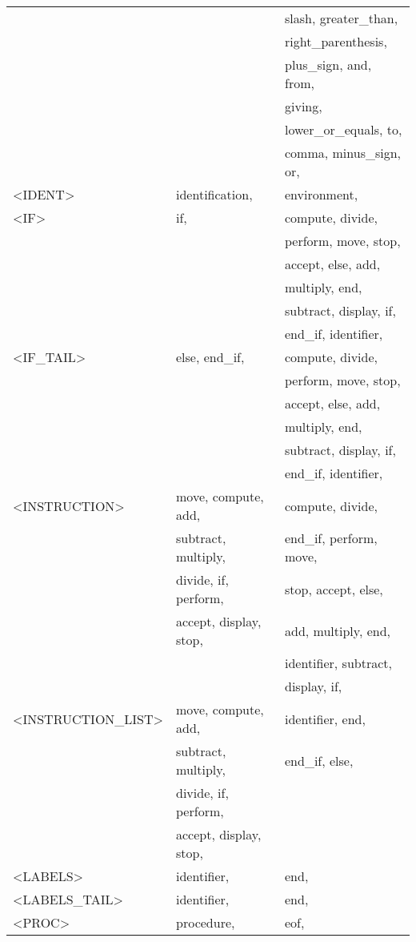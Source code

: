 \begin{longtable}{|l|l|l|}
  &  &   slash, greater\_than, \\ 
  &  &   right\_parenthesis, \\ 
  &  &   plus\_sign, and, from, \\ 
  &  &   giving, \\ 
  &  &   lower\_or\_equals, to, \\ 
  &  &   comma, minus\_sign, or, \\ 
  \hline
<IDENT>  &  identification, &   environment, \\ 
  \hline
<IF>  &  if, &   compute, divide, \\ 
  &  &   perform, move, stop, \\ 
  &  &   accept, else, add, \\ 
  &  &   multiply, end, \\ 
  &  &   subtract, display, if, \\ 
  &  &   end\_if, identifier, \\ 
  \hline
<IF\_TAIL>  &  else, end\_if, &   compute, divide, \\ 
  &  &   perform, move, stop, \\ 
  &  &   accept, else, add, \\ 
  &  &   multiply, end, \\ 
  &  &   subtract, display, if, \\ 
  &  &   end\_if, identifier, \\ 
  \hline
<INSTRUCTION>  &  move, compute, add, &   compute, divide, \\ 
  &  subtract, multiply, &   end\_if, perform, move, \\ 
  &  divide, if, perform, &   stop, accept, else, \\ 
  &  accept, display, stop, &   add, multiply, end, \\ 
  &  &   identifier, subtract, \\ 
  &  &   display, if, \\ 
  \hline
<INSTRUCTION\_LIST>  &  move, compute, add, &   identifier, end, \\ 
  &  subtract, multiply, &   end\_if, else, \\ 
  &  divide, if, perform, &   \\ 
  &  accept, display, stop, &   \\ 
  \hline
<LABELS>  &  identifier, &   end, \\ 
  \hline
<LABELS\_TAIL>  &  identifier, &   end, \\ 
  \hline
<PROC>  &  procedure, &   eof, \\ 

\end{longtable}
